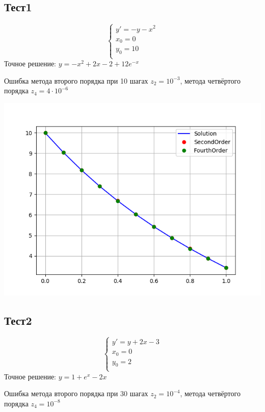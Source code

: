 \documentclass[a4paper,12pt,titlepage,finall]{article}
\begin{document}
\subsection{Тест1}
\begin{equation*}
 \begin{cases}
   y' = -y - x^{2}\\
   x_0 = 0\\
   y_0 = 10\\
 \end{cases}
\end{equation*}
Точное решение: $y = -x^2 + 2x - 2 + 12 e^{-x} $\newline

Ошибка метода второго порядка при 10 шагах $z_2 = 10^{-3}$, метода четвёртого порядка $z_4 = 4 \cdot 10^{-6}$

\includegraphics[width=450pt]{Graphics/0.0.png}\newline
\newpage
\subsection{Тест2}
\begin{equation*}
 \begin{cases}
   y' = y + 2x - 3\\
   x_0 = 0\\
   y_0 = 2\\
 \end{cases}
\end{equation*}
Точное решение: $y = 1 + e^{x} - 2x$\newline

Ошибка метода второго порядка при 30 шагах $z_2 = 10^{-4}$, метода четвёртого порядка $z_4 = 10^{-8}$
\end{document}
